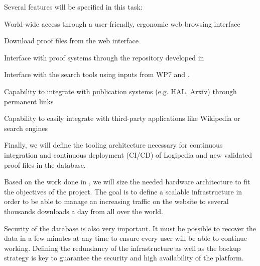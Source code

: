 \begin{workpackage}[id=access,type=RTD,wphases=1-48,
  short=Access,%
  title={Access},
  lead=Inr,InrRM=48,OcaRM=6,EduRM=12]
\begin{tasklist}
{\begin{task}[id=archi,
      title=Defining the functional and software architecture,
      shorttitle=Soft. arch.,
      lead=Inr,InrRM=3,wphases=2-5]
    Several features will be specified in this task:
    \begin{compactitem}
    \item World-wide access through a user-friendly, ergonomic web
      browsing interface
    \item Download proof files from the web interface
    \item Interface with proof systems through the repository developed
      in 
    \item Interface with the search tools using inputs from WP7 and
      .
    \item Capability to integrate with publication systems (e.g. HAL,
      Arxiv) through permanent links
    \item Capability to easily integrate with third-party applications
      like Wikipedia or search engines
    \end{compactitem}

    Finally, we will define the tooling architecture necessary for
    continuous integration and continuous deployment (CI/CD) of
    Logipedia and new validated proof files in the database.
  \end{task}

  \begin{task}[id=infra,
      title=Defining the hardware architecture for the infrastructure,
      shorttitle=HW arch.,
      lead=Inr,InrRM=1,wphases=6-7]
    Based on the work done in , we will
    size the needed hardware architecture to fit the objectives of the
    project. The goal is to define a scalable infrastructure in order
    to be able to manage an increasing traffic on the website to
    several thousands downloads a day from all over the world.

    Security of the database is also very important. It must be
    possible to recover the data in a few minutes at any time to
    ensure every user will be able to continue working. Defining the
    redundancy of the infrastructure as well as the backup strategy is
    key to guarantee the security and high availability of the
    platform.


\end{task}}
\end{tasklist}
\end{workpackage}
